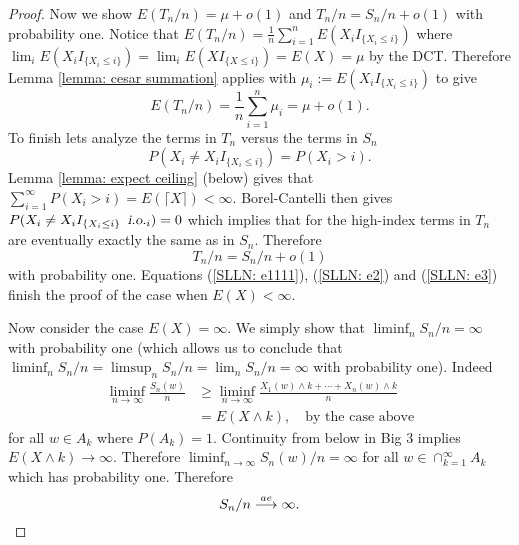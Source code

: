 \begin{proof}
Now we show $E(T_{n}/n)  = \mu + o(1)$ and  $T_{n}/n = S_{n}/n + o(1)$ with probability one.
Notice that
$E(T_{n}/n) = \frac{1}{n} \sum_{i=1}^n E( X_iI_{\{X_i \leq i\}}) $
 where $\lim_i E( X_iI_{\{X_i \leq i\}}) = \lim_i E( X I_{\{X \leq i\}}) = E(X) = \mu$  by the DCT. Therefore Lemma \ref{lemma: cesar summation} applies with $\mu_i:= E( X_iI_{\{X_i \leq i\}})$ to give
\begin{equation}
\label{SLLN: e3}
E(T_{n}/n)  =  \frac{1}{n} \sum_{i=1}^n \mu_i =  \mu + o(1).
\end{equation}
To finish lets analyze the terms in $T_n$ versus the terms in $S_n$
\[P(X_i \neq X_iI_{\{X_i \leq i\}}) = P(X_i > i ).  \]
Lemma \ref{lemma: expect ceiling} (below) gives that $\sum_{i=1}^\infty P(X_i > i ) = E(\lceil X \rceil)<\infty$. Borel-Cantelli  then gives $P(X_i \neq X_iI_{\{X_i \leq i\}} \, {\,\,\text{\sl i.o.} }_i) = 0$  which implies that for the high-index terms in $T_n$ are eventually exactly the same as in $S_n$. Therefore
\begin{equation}
\label{SLLN: e2}
T_{n}/n = S_{n}/n + o(1)
\end{equation}
with probability one.
Equations (\ref{SLLN: e1111}), (\ref{SLLN: e2}) and (\ref{SLLN: e3}) finish the proof of the case when $E(X)<\infty$.




Now  consider the case  $E(X) = \infty$.
We simply show that $\liminf_n S_n/n =\infty$ with probability one (which allows us to conclude that $\liminf_n S_n/n =\limsup_n S_n/n= \lim_n S_n/n = \infty$ with probability one). Indeed
\begin{align*}
\liminf_{n\rightarrow \infty }\frac{S_n(w)}{n}
&\geq \liminf_{n\rightarrow \infty } \frac{X_1(w)\wedge k + \cdots + X_n(w)\wedge k}{n} \\
&= E(X\wedge k), \quad\text{by the case above}
\end{align*}
for all $w\in A_k$ where $P(A_k)=1$. Continuity from below in Big 3 implies $E(X\wedge k)\rightarrow \infty $. Therefore
$\liminf_{n\rightarrow \infty }S_n(w)/n = \infty $
for all $w\in \cap_{k=1}^\infty A_k$ which has probability one. Therefore
\[S_n/n \overset{\small ae} \longrightarrow \infty. \]






 \end{proof} %





